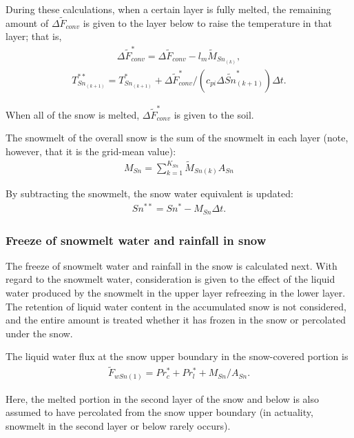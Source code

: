 During these calculations, when a certain layer is fully melted, the remaining amount of \(\Delta \widetilde{F}_{conv}\) is given to the layer below to raise the temperature in that layer; that is, \begin{eqnarray}
\Delta \widetilde{F}_{conv}^{\ast} = \Delta \widetilde{F}_{conv} - l_m \widetilde{M}_{Sn_{(k)}}, \label{8-16}
\end{eqnarray} \begin{eqnarray}
T_{Sn_{(k+1)}}^{\ast\ast}
 = T_{Sn_{(k+1)}}^{\ast} + \Delta \widetilde{F}_{conv}^{\ast} / (c_{pi} \Delta\widetilde{Sn}_{(k+1)}^{\ast}) \Delta t. \label{8-17}
\end{eqnarray}

When all of the snow is melted, \(\Delta \widetilde{F}_{conv}^{\ast}\) is given to the soil.

The snowmelt of the overall snow is the sum of the snowmelt in each layer (note, however, that it is the grid-mean value): \begin{eqnarray}
M_{Sn} = \sum_{k=1}^{K_{Sn}} \widetilde{M}_{Sn(k)} A_{Sn} \label{8-18}
\end{eqnarray}

By subtracting the snowmelt, the snow water equivalent is updated: \begin{eqnarray}
Sn^{\ast\ast} = Sn^{\ast} - M_{Sn} \Delta t. \label{8-19}
\end{eqnarray}

\subsubsection{Freeze of snowmelt water and rainfall in snow}\label{freeze-of-snowmelt-water-and-rainfall-in-snow}

The freeze of snowmelt water and rainfall in the snow is calculated next. With regard to the snowmelt water, consideration is given to the effect of the liquid water produced by the snowmelt in the
upper layer refreezing in the lower layer. The retention of liquid water content in the accumulated snow is not considered, and the entire amount is treated whether it has frozen in the snow or
percolated under the snow.

The liquid water flux at the snow upper boundary in the snow-covered portion is \begin{eqnarray}
\widetilde{F}_{wSn(1)} = Pr_c^{\ast} + Pr_l^{\ast} + M_{Sn} / A_{Sn}. \label{8-20}
\end{eqnarray}

Here, the melted portion in the second layer of the snow and below is also assumed to have percolated from the snow upper boundary (in actuality, snowmelt in the second layer or below rarely occurs).

